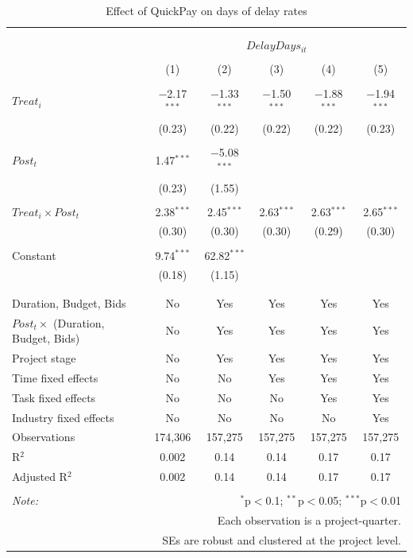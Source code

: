 \documentclass[
]{article}
\begin{document}
\begin{table}[H] \centering 
  \caption{Effect of QuickPay on days of delay rates} 
  \label{} 
\small 
\begin{tabular}{@{\extracolsep{-2pt}}lccccc} 
\\[-1.8ex]\hline 
\hline \\[-1.8ex] 
\\[-1.8ex] & \multicolumn{5}{c}{$DelayDays_{it}$} \\ 
\\[-1.8ex] & (1) & (2) & (3) & (4) & (5)\\ 
\hline \\[-1.8ex] 
 $Treat_i$ & $-$2.17$^{***}$ & $-$1.33$^{***}$ & $-$1.50$^{***}$ & $-$1.88$^{***}$ & $-$1.94$^{***}$ \\ 
  & (0.23) & (0.22) & (0.22) & (0.22) & (0.23) \\ 
  & & & & & \\ 
 $Post_t$ & 1.47$^{***}$ & $-$5.08$^{***}$ &  &  &  \\ 
  & (0.23) & (1.55) &  &  &  \\ 
  & & & & & \\ 
 $Treat_i \times Post_t$ & 2.38$^{***}$ & 2.45$^{***}$ & 2.63$^{***}$ & 2.63$^{***}$ & 2.65$^{***}$ \\ 
  & (0.30) & (0.30) & (0.30) & (0.29) & (0.30) \\ 
  & & & & & \\ 
 Constant & 9.74$^{***}$ & 62.82$^{***}$ &  &  &  \\ 
  & (0.18) & (1.15) &  &  &  \\ 
  & & & & & \\ 
\hline \\[-1.8ex] 
Duration, Budget, Bids & No & Yes & Yes & Yes & Yes \\ 
$Post_t \times$  (Duration, Budget, Bids) & No & Yes & Yes & Yes & Yes \\ 
Project stage & No & Yes & Yes & Yes & Yes \\ 
Time fixed effects & No & No & Yes & Yes & Yes \\ 
Task fixed effects & No & No & No & Yes & Yes \\ 
Industry fixed effects & No & No & No & No & Yes \\ 
Observations & 174,306 & 157,275 & 157,275 & 157,275 & 157,275 \\ 
R$^{2}$ & 0.002 & 0.14 & 0.14 & 0.17 & 0.17 \\ 
Adjusted R$^{2}$ & 0.002 & 0.14 & 0.14 & 0.17 & 0.17 \\ 
\hline 
\hline \\[-1.8ex] 
\textit{Note:}  & \multicolumn{5}{r}{$^{*}$p$<$0.1; $^{**}$p$<$0.05; $^{***}$p$<$0.01} \\ 
 & \multicolumn{5}{r}{Each observation is a project-quarter.} \\ 
 & \multicolumn{5}{r}{SEs are robust and clustered at the project level.} \\ 
\end{tabular} 
\end{table}
\end{document}
